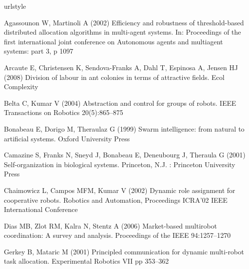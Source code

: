 \documentclass[smallcondensed]{svjour3}
\begin{document}
\begin{thebibliography}{22}
\providecommand{\natexlab}[1]{#1}
\providecommand{\url}[1]{{#1}}
\providecommand{\urlprefix}{URL }
\expandafter\ifx\csname urlstyle\endcsname\relax
  \providecommand{\doi}[1]{DOI~\discretionary{}{}{}#1}\else
  \providecommand{\doi}{DOI~\discretionary{}{}{}\begingroup
  \urlstyle{rm}\Url}\fi
\providecommand{\eprint}[2][]{\url{#2}}

Agassounon W, Martinoli A (2002) {Efficiency and robustness of threshold-based
  distributed allocation algorithms in multi-agent systems}. In: Proceedings of
  the first international joint conference on Autonomous agents and multiagent
  systems: part 3, p 1097

Arcaute E, Christensen K, Sendova-Franks A, Dahl T, Espinosa A, Jensen HJ
  (2008) Division of labour in ant colonies in terms of attractive fields. Ecol
  Complexity

Belta C, Kumar V (2004) {Abstraction and control for groups of robots}. IEEE
  Transactions on Robotics 20(5):865--875

Bonabeau E, Dorigo M, Theraulaz G (1999) Swarm intelligence: from natural to
  artificial systems. Oxford University Press

Camazine S, Franks N, Sneyd J, Bonabeau E, Deneubourg J, Theraula G (2001)
  Self-organization in biological systems. Princeton, N.J. : Princeton
  University Press

Chaimowicz L, Campos MFM, Kumar V (2002) Dynamic role assignment for
  cooperative robots. Robotics and Automation, Proceedings ICRA'02 IEEE
  International Conference

Dias MB, Zlot RM, Kalra N, Stentz A (2006) Market-based multirobot
  coordination: A survey and analysis. Proceedings of the IEEE 94:1257--1270

Gerkey B, Mataric M (2001) {Principled communication for dynamic multi-robot
  task allocation}. Experimental Robotics VII pp 353--362


\end{thebibliography}
\end{document}
